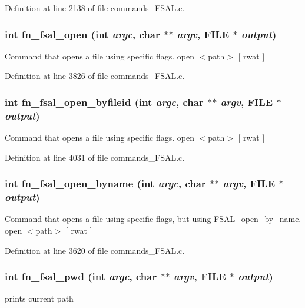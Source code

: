 Definition at line 2138 of file commands\_\-FSAL.c.
\subsubsection[{fn\_\-fsal\_\-open}]{\setlength{\rightskip}{0pt plus 5cm}int fn\_\-fsal\_\-open (int {\em argc}, \/  char $\ast$$\ast$ {\em argv}, \/  FILE $\ast$ {\em output})}\label{commands__FSAL_8c_a7eb0d8c88e206ec8f0a2c3bc7b8586b5}
Command that opens a file using specific flags. open $<$path$>$ [ rwat ] 

Definition at line 3826 of file commands\_\-FSAL.c.
\subsubsection[{fn\_\-fsal\_\-open\_\-byfileid}]{\setlength{\rightskip}{0pt plus 5cm}int fn\_\-fsal\_\-open\_\-byfileid (int {\em argc}, \/  char $\ast$$\ast$ {\em argv}, \/  FILE $\ast$ {\em output})}\label{commands__FSAL_8c_a2d40d85e39ad21317aee36aa87be48d0}
Command that opens a file using specific flags. open $<$path$>$ [ rwat ] 

Definition at line 4031 of file commands\_\-FSAL.c.
\subsubsection[{fn\_\-fsal\_\-open\_\-byname}]{\setlength{\rightskip}{0pt plus 5cm}int fn\_\-fsal\_\-open\_\-byname (int {\em argc}, \/  char $\ast$$\ast$ {\em argv}, \/  FILE $\ast$ {\em output})}\label{commands__FSAL_8c_aa74f1d4efec11e55723d0ac4eaf7856e}
Command that opens a file using specific flags, but using FSAL\_\-open\_\-by\_\-name. open $<$path$>$ [ rwat ] 

Definition at line 3620 of file commands\_\-FSAL.c.
\subsubsection[{fn\_\-fsal\_\-pwd}]{\setlength{\rightskip}{0pt plus 5cm}int fn\_\-fsal\_\-pwd (int {\em argc}, \/  char $\ast$$\ast$ {\em argv}, \/  FILE $\ast$ {\em output})}\label{commands__FSAL_8c_a5889873765cfb1062f3fab4ffd7a38cb}
prints current path 

